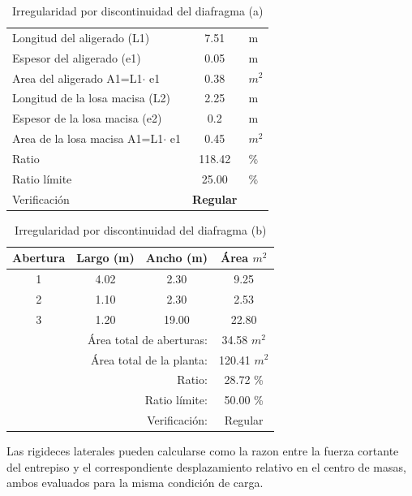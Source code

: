 \documentclass{article}%
\begin{document}
\begin{table}[H]%
\centering%
\caption{Irregularidad por discontinuidad del diafragma (a)}%
\begin{tabular}{|ll|c|r}%
\cline{1-3}%
\multicolumn{2}{|l|}{Longitud del aligerado (L1)} & 7.51 & \multicolumn{1}{l}{m} \\%
\cline{1-3}%
\multicolumn{2}{|l|}{Espesor del aligerado (e1)} & 0.05 & \multicolumn{1}{l}{m} \\%
\cline{1-3}%
\multicolumn{2}{|l|}{Area del aligerado A1=L1$\cdot$ e1} & 0.38 & \multicolumn{1}{l}{$m^2$} \\%
\cline{1-3}%
\multicolumn{2}{|l|}{Longitud de la losa macisa (L2)} & 2.25 & \multicolumn{1}{l}{m} \\%
\cline{1-3}%
\multicolumn{2}{|l|}{Espesor de la losa macisa (e2)} & 0.2 & \multicolumn{1}{l}{m} \\%
\cline{1-3}%
\multicolumn{2}{|l|}{Area de la losa macisa A1=L1$\cdot$ e1} & 0.45 & \multicolumn{1}{l}{$m^2$} \\%
\cline{1-3}%
\multicolumn{2}{|l|}{Ratio} & 118.42 & \multicolumn{1}{l}{\%} \\%
\cline{1-3}%
\multicolumn{2}{|l|}{Ratio límite} & 25.00 & \multicolumn{1}{l}{\%} \\%
\cline{1-3}%
\multicolumn{2}{|l|}{Verificación} & \textcolor[rgb]{ .267,  .447,  .769}{\textbf{Regular}} & \multicolumn{1}{l}{} \\%
\cline{1-3}%
\end{tabular}%
\end{table}

%


\begin{table}[H]%
\centering%
\caption{Irregularidad por discontinuidad del diafragma (b)}%
\begin{tabular}{cccc}%
\hline%
\textbf{Abertura}&\textbf{Largo (m)}&\textbf{Ancho (m)}&\textbf{Área $m^2$}\\%
\hline%
1&4.02&2.30&9.25\\%
\hline%
2&1.10&2.30&2.53\\%
\hline%
3&1.20&19.00&22.80\\%
\hline%
&\multicolumn{2}{r}{Área total de aberturas:}&34.58 $m^2$\\%
&\multicolumn{2}{r}{Área total de la planta:}&120.41 $m^2$\\%
&\multicolumn{2}{r}{Ratio:}&28.72 \%\\%
&\multicolumn{2}{r}{Ratio límite:}&50.00 \%\\%
&\multicolumn{2}{r}{Verificación:}&\textcolor[rgb]{ .267,  .447,  .769} {Regular}\\%
\end{tabular}%
\end{table}

%
Las rigideces laterales pueden calcularse como la razon entre la fuerza cortante del entrepiso y el correspondiente desplazamiento relativo en el centro de masas, ambos evaluados para la misma condición de carga. \newline%
%
\end{document}
